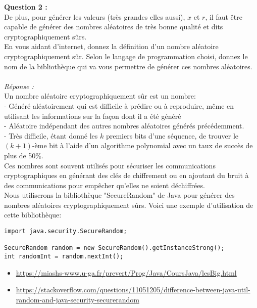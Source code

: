 \documentclass[a4paper,11pt]{article}
\begin{document}
        \label{subsec:Q2}
        \textbf{Question 2 : \\}De plus, pour générer les valeurs (très grandes elles aussi), $x$ et $r$, il faut être capable de générer des nombres aléatoires de très bonne qualité et dits cryptographiquement sûrs.\\En vous aidant d’internet, donnez la définition d’un nombre aléatoire cryptographiquement sûr. Selon le langage de programmation choisi, donnez le nom de la bibliothèque qui va vous permettre de générer ces nombres aléatoires.\\ \textit{\\Réponse :}\\Un nombre aléatoire cryptographiquement sûr est un nombre:\\ - Généré aléatoirement qui est difficile à prédire ou à reproduire, même en utilisant les informations sur la façon dont il a été généré\\ - Aléatoire indépendant des autres nombres aléatoires générés précédemment.\\ - Très difficile, étant donné les $k$ premiers bits d'une séquence, de trouver le $(k+1)$-ème bit à l'aide d'un algorithme polynomial avec un taux de succès de plus de 50\%.\\ Ces nombres sont souvent utilisés pour sécuriser les communications cryptographiques en générant des clés de chiffrement ou en ajoutant du bruit à des communications pour empêcher qu'elles ne soient déchiffrées.\\
        Nous utiliserons la bibliothèque "SecureRandom" de Java pour générer des nombres aléatoires cryptographiquement sûrs. Voici une exemple d'utilisation de cette bibliothèque: \begin{lstlisting}
import java.security.SecureRandom;

SecureRandom random = new SecureRandom().getInstanceStrong();
int randomInt = random.nextInt();

        \end{lstlisting}
        \begin{itemize}
                \item \url{https://miashs-www.u-ga.fr/prevert/Prog/Java/CoursJava/lesBig.html}
                \item \url{https://stackoverflow.com/questions/11051205/difference-between-java-util-random-and-java-security-securerandom}
        \end{itemize}
\end{document}
